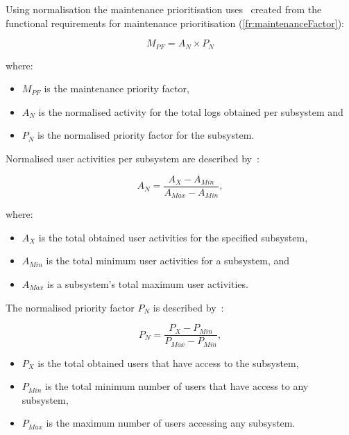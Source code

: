 Using normalisation the maintenance prioritisation uses~ created from the functional requirements for maintenance prioritisation (\ref{fr:maintenanceFactor}):

\begin{equation}
	\label{eq:ch2_maintenanceFactorSimplified}
	M_{PF} = A_{N} \times P_{N}
\end{equation}

where:

\begin{itemize}
	\item $M_{PF}$ is the maintenance priority factor,
	\item $A_{N}$ is the normalised activity for the total logs obtained per subsystem and
	\item $P_{N}$ is the normalised priority factor for the subsystem.
\end{itemize}

Normalised user activities per subsystem are described by~:

\begin{equation}
	\label{eq:ch2_eventNormalised}
	A_{N} = \frac{A_X - A_{Min}}{A_{Max} - A_{Min}},
\end{equation}

where:

\begin{itemize}
	\item $A_X$ is the total obtained user activities for the specified subsystem,
	\item $A_{Min}$ is the total minimum user activities for a subsystem, and
	\item $A_{Max}$ is a subsystem's total maximum user activities.
\end{itemize}

The normalised priority factor $P_N$ is described by~:

\begin{equation}
	\label{eq:ch2_priorityNormalised}
	P_{N} = \frac{P_X - P_{Min}}{P_{Max} - P_{Min}},
\end{equation}

\begin{itemize}
	\item $P_X$ is the total obtained users that have access to the subsystem,
	\item $P_{Min}$ is the total minimum number of users that have access to any subsystem,
	\item $P_{Max}$ is the maximum number of users accessing any subsystem.
\end{itemize}

